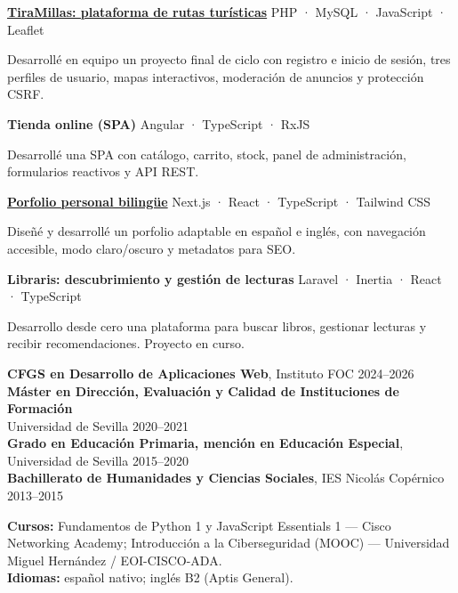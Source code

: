 \documentclass[10pt]{article}
\begin{document}
\textbf{\href{https://github.com/Loreber/TiraMillas}{TiraMillas: plataforma de rutas turísticas}} \hfill PHP · MySQL · JavaScript · Leaflet

\entryspace
\begin{highlights}
  \item Desarrollé en equipo un proyecto final de ciclo con registro e inicio de sesión, tres perfiles de usuario, mapas interactivos, moderación de anuncios y protección CSRF.
\end{highlights}

\entryspace
\textbf{Tienda online (SPA)} \hfill Angular · TypeScript · RxJS

\entryspace
\begin{highlights}
  \item Desarrollé una SPA con catálogo, carrito, stock, panel de administración, formularios reactivos y API REST.
\end{highlights}

\entryspace
\textbf{\href{https://loreber.vercel.app}{Porfolio personal bilingüe}} \hfill Next.js · React · TypeScript · Tailwind CSS

\entryspace
\begin{highlights}
  \item Diseñé y desarrollé un porfolio adaptable en español e inglés, con navegación accesible, modo claro/oscuro y metadatos para SEO.
\end{highlights}

\entryspace
\textbf{Libraris: descubrimiento y gestión de lecturas} \hfill Laravel · Inertia · React · TypeScript

\entryspace
\begin{highlights}
  \item Desarrollo desde cero una plataforma para buscar libros, gestionar lecturas y recibir recomendaciones. Proyecto en curso.
\end{highlights}

\textbf{CFGS en Desarrollo de Aplicaciones Web}, Instituto FOC \hfill 2024--2026\\[0.10cm]
\textbf{Máster en Dirección, Evaluación y Calidad de Instituciones de Formación}\\[-0.02cm]
Universidad de Sevilla \hfill 2020--2021\\[0.10cm]
\textbf{Grado en Educación Primaria, mención en Educación Especial}, Universidad de Sevilla
\hfill 2015--2020\\[0.10cm]
\textbf{Bachillerato de Humanidades y Ciencias Sociales}, IES Nicolás Copérnico
\hfill 2013--2015

\textbf{Cursos:} Fundamentos de Python 1 y JavaScript Essentials 1 --- Cisco Networking Academy; Introducción a la Ciberseguridad (MOOC) --- Universidad Miguel Hernández / EOI-CISCO-ADA.\\[0.10cm]
\textbf{Idiomas:} español nativo; inglés B2 (Aptis General).
\end{document}
